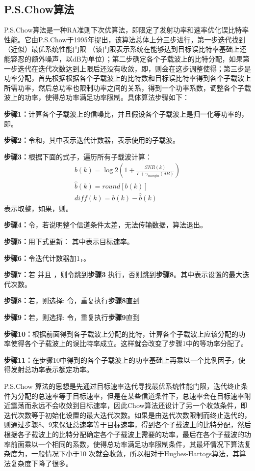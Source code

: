 \subsection{P.S.Chow算法}
P.S.Chow算法\cite{chow1995practical}是一种RA准则下次优算法，即限定了发射功率和速率优化误比特率性能。它由P.S.Chow于1995年提出，该算法总体上分三步进行，第一步迭代找到（近似）最优系统性能门限 （该门限表示系统在能够达到目标误比特率基础上还能容忍的额外噪声，以dB为单位）；第二步确定各个子载波上的比特分配，如果第一步迭代在迭代次数达到上限后还没有收敛，即，则会在这步调整使得；第三步是功率分配，首先根据根据各个子载波上的比特数和目标误比特率得到各个子载波上所需功率，然后总功率也限制功率之间的关系，得到一个功率系数，调整各个子载波上的功率，使得总功率满足功率限制。具体算法步骤如下：
\begin{description}
\item{\bf{步骤1：}}计算各个子载波上的信噪比，并且假设各个子载波上是归一化等功率的，即。
\item{\bf{步骤2：}}令和，其中表示迭代计数器，表示使用的子载波。
\item{\bf{步骤3：}}根据下面的式子，遍历所有子载波计算：
\begin{eqnarray}
b(k)=\log2(1+\frac{SNR(k)}{\Gamma+\gamma_{margin}(dB)})\\
\hat{b}(k)=round[b(k)]\\
diff(k)=b(k)-\hat{b}(k)
\end{eqnarray}
表示取整，如果，则。
\item{\bf{步骤4：}}令，若说明整个信道条件太差，无法传输数据，算法退出。
\item{\bf{步骤5：}}用下式更新：
其中表示目标速率。
\item{\bf{步骤6：}}令迭代计数器加1，。
\item{\bf{步骤7：}}若 并且 ，则令跳到\textbf{步骤3} 执行，否则跳到\textbf{步骤8}。其中表示设置的最大迭代次数。
\item{\bf{步骤8：}}若，则选择:
令，重复执行\textbf{步骤8}直到
\item{\bf{步骤9：}}若，则选择:
令，重复执行\textbf{步骤9}直到
\item{\bf{步骤10：}}根据前面得到各子载波上分配的比特，计算各个子载波上应该分配的功率使得各个子载波上的误比特率成立。这样就会改变了步骤1中的等功率分配了。
\item{\bf{步骤11：}}在步骤10中得到的各个子载波上的功率基础上再乘以一个比例因子，使得发射总功率表示额定功率。
\end{description}

P.S.Chow 算法的思想是先通过目标速率迭代寻找最优系统性能门限，迭代终止条件为分配的总速率等于目标速率，但是在某些信道条件下，总速率会在目标速率附近震荡而永远不会收敛到目标速率，因此Chow算法还设计了另一个收敛条件，即迭代次数等于初始化设置的最大迭代次数。如果是由迭代次数限制而终止迭代的，则通过步骤8、9来保证总速率等于目标速率，得到各个子载波上的比特分配，然后根据各子载波上的比特分配确定各个子载波上需要的功率，最后在各个子载波的功率前面乘以一个相同的系数，使得总功率满足功率限制条件，其最坏情况下算法复杂度为，一般情况下小于10 次就会收敛，所以相对于Hughes-Hartogs算法，其算法复杂度下降了很多。
